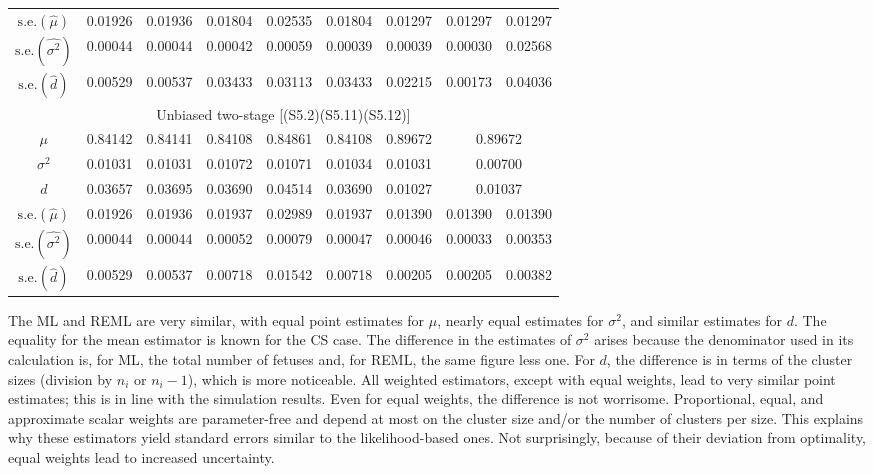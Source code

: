 \documentclass[11pt,a5paper,twoside]{book}
\begin{document}
\begin{table}[!t]
\begin{center}
\begin{tabular}{ccccccccc}
\hline
$\mbox{s.e.}(\widehat{\mu})$ & 0.01926 & 0.01936 & 0.01804 & 0.02535 & 0.01804 & 0.01297 & 0.01297 & 0.01297 \\
$\mbox{s.e.}(\widehat{\sigma^2})$ & 0.00044 & 0.00044 & 0.00042 & 0.00059 & 0.00039 & 0.00039 & 0.00030 & 0.02568 \\
  $\mbox{s.e.}(\widehat{d})$ & 0.00529 & 0.00537 & 0.03433 & 0.03113 & 0.03433 & 0.02215 & 0.00173 & 0.04036 \\
\hline\hline
\multicolumn{9}{c}{{Unbiased two-stage [(S5.2)(S5.11)(S5.12)]}}\\
\hline
$\mu$ & 0.84142 & 0.84141 & 0.84108 & 0.84861 & 0.84108 & 0.89672 & \multicolumn{2}{c}{0.89672}  \\
  $\sigma^2$ & 0.01031 & 0.01031 & 0.01072 & 0.01071 & 0.01034 & 0.01031 & \multicolumn{2}{c}{0.00700}  \\
$d$  & 0.03657 & 0.03695 & 0.03690 & 0.04514 & 0.03690 & 0.01027 & \multicolumn{2}{c}{0.01037}  \\

\hline
$\mbox{s.e.}(\widehat{\mu})$ & 0.01926 & 0.01936 & 0.01937 & 0.02989 & 0.01937 & 0.01390 & 0.01390 & 0.01390 \\
$\mbox{s.e.}(\widehat{\sigma^2})$ & 0.00044 & 0.00044 & 0.00052 & 0.00079 & 0.00047 & 0.00046 & 0.00033 & 0.00353 \\
  $\mbox{s.e.}(\widehat{d})$ & 0.00529 & 0.00537 & 0.00718 & 0.01542 & 0.00718 & 0.00205 & 0.00205 & 0.00382 \\

\hline\hline
\end{tabular}
\end{center}
\end{table}


The ML and REML are very similar, with equal point estimates for $\mu$, 
nearly equal estimates for $\sigma^2$, and similar estimates for $d$. 
The equality for the mean estimator is known for the CS case. 
The difference in the estimates of $\sigma^2$ arises because 
the denominator used in its calculation is, for ML, the total number of 
fetuses and, for REML, the same figure less one.
For $d$, the difference is in terms of the cluster sizes 
(division by $n_i$ or $n_i-1$), which is more noticeable. 
All weighted estimators, except with equal weights, 
lead to very similar point estimates; this is in line with the 
simulation results. Even for equal weights, the difference 
is not worrisome. Proportional, equal, and approximate scalar 
weights are parameter-free and depend at most on the cluster 
size and/or the number of clusters per size. This explains 
why these estimators yield standard errors similar to the 
likelihood-based ones. Not surprisingly, because of their 
deviation from optimality, equal weights lead to increased 
uncertainty.
\end{document}

